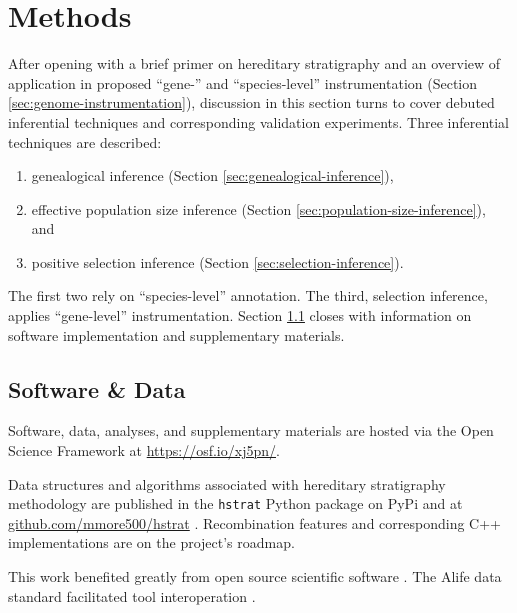 \section{Methods} \label{sec:methods}

After opening with a brief primer on hereditary stratigraphy and an overview of application in proposed ``gene-'' and ``species-level'' instrumentation (Section \ref{sec:genome-instrumentation}), discussion in this section turns to cover debuted inferential techniques and corresponding validation experiments.
Three inferential techniques are described:
\begin{enumerate}
\item genealogical inference (Section \ref{sec:genealogical-inference}),
\item effective population size inference (Section \ref{sec:population-size-inference}), and
\item positive selection inference (Section \ref{sec:selection-inference}).
\end{enumerate}

The first two rely on ``species-level'' annotation.
The third, selection inference, applies ``gene-level'' instrumentation.
Section \ref{sec:software-data} closes with information on software implementation and supplementary materials.









\subsection{Software \& Data}
\label{sec:software-data}

Software, data, analyses, and supplementary materials are hosted via the Open Science Framework at \url{https://osf.io/xj5pn/}.

Data structures and algorithms associated with hereditary stratigraphy methodology are published in the \texttt{hstrat} Python package on PyPi and at \url{github.com/mmore500/hstrat} \citep{moreno2022hstrat}.
Recombination features and corresponding C++ implementations are on the project's roadmap.

This work benefited greatly from open source scientific software \citep{cock2009biopython,fortin2012deap,sand2014tqdist}.
The Alife data standard facilitated tool interoperation \citep{lalejini2019data}.
